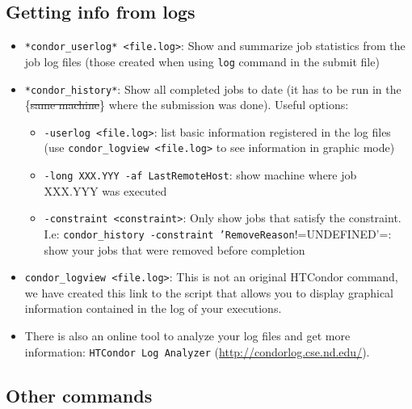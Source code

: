 \documentclass[a4paper,10pt]{article}
\begin{document}
\subsection{Getting info from logs}
\label{sec:org19ed2f1}

\begin{itemize}
\item \texttt{*condor\_userlog* <file.log>}: Show and summarize job statistics from the job
log files (those created when using \texttt{log} command in the submit file)

\item \texttt{*condor\_history*}: Show all completed jobs to date (it has to be run in the
\{\sout{same machine}\} where the submission was done). Useful options:
\begin{itemize}
\item \texttt{-userlog <file.log>}: list basic information registered in the log files (use
\texttt{condor\_logview <file.log>} to see information in graphic mode)
\item \texttt{-long XXX.YYY -af LastRemoteHost}: show machine where job XXX.YYY was
executed
\item \texttt{-constraint <constraint>}: Only show jobs that satisfy the constraint. I.e:
\texttt{condor\_history -constraint 'RemoveReason}!=UNDEFINED'=: show your jobs that
were removed before completion
\end{itemize}

\item \texttt{condor\_logview <file.log>}: This is not an original HTCondor command, we have
created this link to the script that allows you to display graphical
information contained in the log of your executions.

\item There is also an online tool to analyze your log files and get more
information: \texttt{HTCondor Log Analyzer} (\url{http://condorlog.cse.nd.edu/}).
\end{itemize}

\subsection{Other commands}
\label{sec:org3375e9a}
\end{document}
